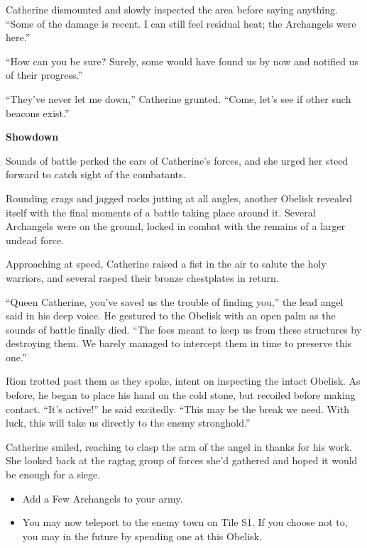 \begin{multicols*}{2}
Catherine dismounted and slowly inspected the area before saying anything.
``Some of the damage is recent.
I can still feel residual heat; the Archangels were here.''

``How can you be sure? Surely, some would have found us by now and notified us of their progress.''

``They've never let me down,'' Catherine grunted.
``Come, let's see if other such beacons exist.''

\textbf{Showdown}

Sounds of battle perked the ears of Catherine's forces, and she urged her steed forward to catch sight of the combatants.

Rounding crags and jagged rocks jutting at all angles, another Obelisk revealed itself with the final moments of a battle taking place around it.
Several Archangels were on the ground, locked in combat with the remains of a larger undead force.

Approaching at speed, Catherine raised a fist in the air to salute the holy warriors, and several rasped their bronze chestplates in return.

``Queen Catherine, you've saved us the trouble of finding you,'' the lead angel said in his deep voice.
He gestured to the Obelisk with an open palm as the sounds of battle finally died.
``The foes meant to keep us from these structures by destroying them.
We barely managed to intercept them in time to preserve this one.''

Rion trotted past them as they spoke, intent on inspecting the intact Obelisk.
As before, he began to place his hand on the cold stone, but recoiled before making contact.
``It's active!'' he said excitedly.
``This may be the break we need.
With luck, this will take us directly to the enemy stronghold.''

Catherine smiled, reaching to clasp the arm of the angel in thanks for his work.
She looked back at the ragtag group of forces she'd gathered and hoped it would be enough for a siege.

\begin{itemize}
  \item \textcolor{darkcandyapplered}{Add a Few Archangels to your army.}
  \item \textcolor{darkcandyapplered}{You may now teleport to the enemy town on Tile S1.
    If you choose not to, you may in the future by spending one  at this Obelisk.}
\end{itemize}



\end{multicols*}
